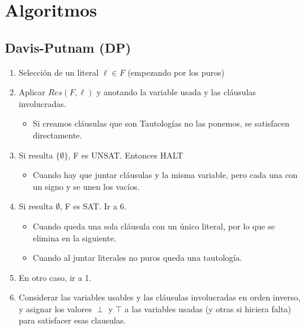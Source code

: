 \documentclass[12pt, twoside, openright]{report} %
\begin{document}
\section{Algoritmos}
\subsection{Davis-Putnam (DP)}

  \begin{enumerate}

  \item
    Selección de un literal \(\ell \in F\) (empezando por los puros)
  \item
    Aplicar \(Res(F,\ell)\) y anotando la variable usada y las cláusulas
    involucradas.

    \begin{itemize}
  
    \item
      Si creamos cláusulas que son Tautologías no las ponemos, se
      satisfacen directamente.
    \end{itemize}
  \item
    Si resulta $\{ \emptyset \}$, F es UNSAT. Entonces HALT

    \begin{itemize}
  
    \item
      Cuando hay que juntar cláusulas y la misma variable, pero cada una
      con un signo y se unen los vacíos.
    \end{itemize}
  \item
    Si resulta \(\emptyset\), F es SAT. Ir a 6.

    \begin{itemize}
  
    \item
      Cuando queda una sola cláusula con un único literal, por lo que se
      elimina en la siguiente.
    \item
      Cuando al juntar literales no puros queda una tautología.
    \end{itemize}
  \item
    En otro caso, ir a 1.
  \item
    Considerar las variables usables y las cláusulas involucradas en
    orden inverso, y asignar los valores \(\perp\) y \(\top\) a las
    variables usadas (y otras si hiciera falta) para satisfacer esas
    clausulas.
  \end{enumerate}
\end{document}
